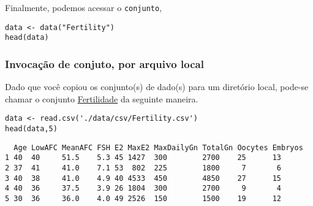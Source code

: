 \documentclass[11pt]{article}
\begin{document}
Finalmente, podemos acessar o \texttt{conjunto},
\begin{verbatim}
data <- data("Fertility")
head(data)
\end{verbatim}
\subsubsection{Invocação de conjuto, por arquivo local}
\label{sec:org8f56d79}

Dado que você copiou os conjunto(s) de dado(s) para um diretório
local, pode-se chamar o conjunto \href{https://drive.google.com/file/d/1iG15B5sUrntNJCjpIXT7Li1IHOlpvSKc/view?usp=sharing}{Fertilidade} da seguinte maneira.

\begin{verbatim}
data <- read.csv('./data/csv/Fertility.csv')
head(data,5)
\end{verbatim}

\begin{verbatim}
  Age LowAFC MeanAFC FSH E2 MaxE2 MaxDailyGn TotalGn Oocytes Embryos
1 40  40     51.5    5.3 45 1427  300        2700    25      13     
2 37  41     41.0    7.1 53  802  225        1800     7       6     
3 40  38     41.0    4.9 40 4533  450        4850    27      15     
4 40  36     37.5    3.9 26 1804  300        2700     9       4     
5 30  36     36.0    4.0 49 2526  150        1500    19      12     
\end{verbatim}
\end{document}
